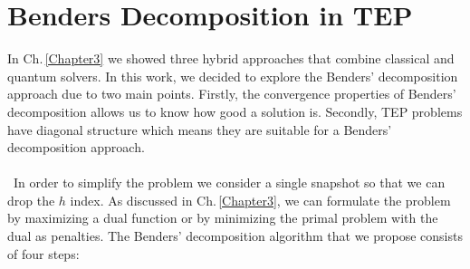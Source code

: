\section{Benders Decomposition in TEP}
In Ch.\,\ref{Chapter3} we showed three hybrid approaches that combine classical and quantum solvers. In this work, we decided to explore the Benders' decomposition approach due to two main points. Firstly, the convergence properties of Benders' decomposition allows us to know how good a solution is. Secondly, TEP problems have diagonal structure which means they are suitable for a Benders' decomposition approach.\\\\\
In order to simplify the problem we consider a single snapshot so that we can drop the $h$ index. As discussed in Ch.\,\ref{Chapter3}, we can formulate the problem by maximizing a dual function or by minimizing the primal problem with the dual as penalties. The Benders' decomposition algorithm that we propose consists of four steps:
